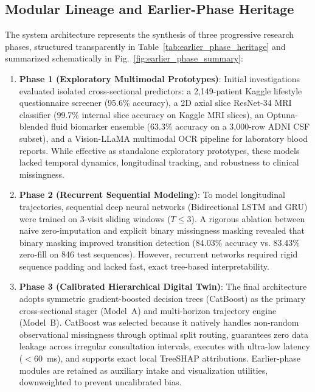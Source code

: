 \documentclass[11pt,a4paper]{article}
\begin{document}
\subsection{Modular Lineage and Earlier-Phase Heritage}
\label{sec:method_heritage}
The system architecture represents the synthesis of three progressive research phases, structured transparently in Table~\ref{tab:earlier_phase_heritage} and summarized schematically in Fig.~\ref{fig:earlier_phase_summary}:
\begin{enumerate}
    \item \textbf{Phase 1 (Exploratory Multimodal Prototypes)}: Initial investigations evaluated isolated cross-sectional predictors: a 2,149-patient Kaggle lifestyle questionnaire screener (95.6\% accuracy), a 2D axial slice ResNet-34 MRI classifier (99.7\% internal slice accuracy on Kaggle MRI slices), an Optuna-blended fluid biomarker ensemble (63.3\% accuracy on a 3,000-row ADNI CSF subset), and a Vision-LLaMA multimodal OCR pipeline for laboratory blood reports. While effective as standalone exploratory prototypes, these models lacked temporal dynamics, longitudinal tracking, and robustness to clinical missingness.
    \item \textbf{Phase 2 (Recurrent Sequential Modeling)}: To model longitudinal trajectories, sequential deep neural networks (Bidirectional LSTM and GRU) were trained on 3-visit sliding windows ($T \le 3$). A rigorous ablation between naive zero-imputation and explicit binary missingness masking revealed that binary masking improved transition detection (84.03\% accuracy vs. 83.43\% zero-fill on 846 test sequences). However, recurrent networks required rigid sequence padding and lacked fast, exact tree-based interpretability.
    \item \textbf{Phase 3 (Calibrated Hierarchical Digital Twin)}: The final architecture adopts symmetric gradient-boosted decision trees (CatBoost) as the primary cross-sectional stager (Model~A) and multi-horizon trajectory engine (Model~B). CatBoost was selected because it natively handles non-random observational missingness through optimal split routing, guarantees zero data leakage across irregular consultation intervals, executes with ultra-low latency ($< 60$~ms), and supports exact local TreeSHAP attributions. Earlier-phase modules are retained as auxiliary intake and visualization utilities, downweighted to prevent uncalibrated bias.
\end{enumerate}


\end{document}
